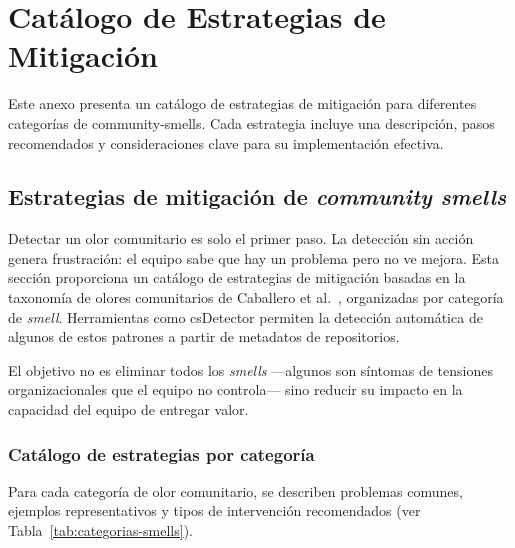 \chapter{Catálogo de Estrategias de Mitigación}
\label{anexo:catalogo-estrategias-mitigacion}

Este anexo presenta un catálogo de estrategias de mitigación para diferentes categorías de \gls{community-smells}. Cada estrategia incluye una descripción, pasos recomendados y consideraciones clave para su implementación efectiva.

\section{Estrategias de mitigación de \textit{community smells}}

Detectar un olor comunitario es solo el primer paso. La detección sin acción genera frustración: el equipo sabe que hay un problema pero no ve mejora. Esta sección proporciona un catálogo de estrategias de mitigación basadas en la taxonomía de olores comunitarios de Caballero et al.\ \cite{caballero2022communitysmells}, organizadas por categoría de \textit{smell}. Herramientas como csDetector \cite{almarimi2021csDetector} permiten la detección automática de algunos de estos patrones a partir de metadatos de repositorios.

El objetivo no es eliminar todos los \textit{smells} ---algunos son síntomas de tensiones organizacionales que el equipo no controla--- sino reducir su impacto en la capacidad del equipo de entregar valor.

\subsection{Catálogo de estrategias por categoría}

Para cada categoría de olor comunitario, se describen problemas comunes, ejemplos representativos y tipos de intervención recomendados (ver Tabla~\ref{tab:categorias-smells}).

\begingroup
\scriptsize
\renewcommand{\arraystretch}{1.4}
\setlength{\tabcolsep}{4pt}
\setlength{\LTleft}{0pt}
\setlength{\LTright}{0pt}

